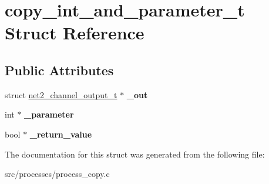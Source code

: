 \hypertarget{structcopy__int__and__parameter__t}{\section{copy\-\_\-int\-\_\-and\-\_\-parameter\-\_\-t Struct Reference}
\label{structcopy__int__and__parameter__t}
}
\subsection*{Public Attributes}
\begin{DoxyCompactItemize}
\item 
\hypertarget{structcopy__int__and__parameter__t_a9775d5ac5976ceaf38b2719f455b7b42}{struct \hyperlink{structnet2__channel__output__t}{net2\-\_\-channel\-\_\-output\-\_\-t} $\ast$ {\bfseries \-\_\-out}}\label{structcopy__int__and__parameter__t_a9775d5ac5976ceaf38b2719f455b7b42}

\item 
\hypertarget{structcopy__int__and__parameter__t_a6c9f9f3e8d273fc0a2336c0e900fb382}{int $\ast$ {\bfseries \-\_\-parameter}}\label{structcopy__int__and__parameter__t_a6c9f9f3e8d273fc0a2336c0e900fb382}

\item 
\hypertarget{structcopy__int__and__parameter__t_ae95f1f2df8e9877a563fe27fc3b0ca28}{bool $\ast$ {\bfseries \-\_\-return\-\_\-value}}\label{structcopy__int__and__parameter__t_ae95f1f2df8e9877a563fe27fc3b0ca28}

\end{DoxyCompactItemize}


The documentation for this struct was generated from the following file\-:\begin{DoxyCompactItemize}
\item 
src/processes/process\-\_\-copy.\-c\end{DoxyCompactItemize}
